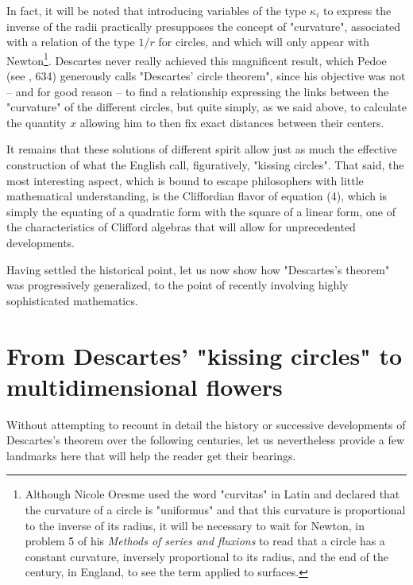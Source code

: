 \documentclass[12pt]{article}
\theoremstyle{définition}
\theoremstyle{remark}
\theoremstyle{plain}
\theoremstyle{plain}
\begin{document}
In fact, it will be noted that introducing variables of the type $\kappa_i$ to express the inverse of the radii practically presupposes the concept of "curvature", associated with a relation of the type $1/r$ for circles, and which will only appear with Newton\footnote{Although Nicole Oresme used the word "curvitas" in Latin and declared that the curvature of a circle is "uniformus" and that this curvature is proportional to the inverse of its radius, it will be necessary to wait for Newton, in problem 5 of his {\it Methods of series and fluxions} to read that a circle has a constant curvature, inversely proportional to its radius, and the end of the century, in England, to see the term applied to surfaces.}. Descartes never really achieved this magnificent result, which Pedoe (see \cite{Ped}, 634) generously calls "Descartes' circle theorem", since his objective was not -- and for good reason -- to find a relationship expressing the links between the "curvature" of the different circles, but quite simply, as we said above, to calculate the quantity $x$ allowing him to then fix exact distances between their centers.

 It remains that these solutions of different spirit allow just as much the effective construction of what the English call, figuratively, "kissing circles". That said, the most interesting aspect, which is bound to escape philosophers with little mathematical understanding, is the Cliffordian flavor of equation (4), which is simply the equating of a quadratic form with the square of a linear form, one of the characteristics of Clifford algebras that will allow for unprecedented developments.

Having settled the historical point, let us now show how "Descartes's theorem" was progressively generalized, to the point of recently involving highly sophisticated mathematics.


\section{From Descartes' "kissing circles" to multidimensional flowers}

Without attempting to recount in detail the history or successive developments of Descartes's theorem over the following centuries, let us nevertheless provide a few landmarks here that will help the reader get their bearings.
\end{document}
